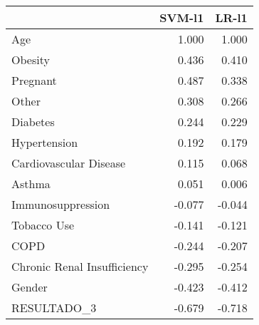 \begin{tabular}{lrr}
\toprule
{} &  SVM-l1 &  LR-l1 \\
\midrule
Age                         &   1.000 &  1.000 \\
Obesity                     &   0.436 &  0.410 \\
Pregnant                    &   0.487 &  0.338 \\
Other                       &   0.308 &  0.266 \\
Diabetes                    &   0.244 &  0.229 \\
Hypertension                &   0.192 &  0.179 \\
Cardiovascular Disease      &   0.115 &  0.068 \\
Asthma                      &   0.051 &  0.006 \\
Immunosuppression           &  -0.077 & -0.044 \\
Tobacco Use                 &  -0.141 & -0.121 \\
COPD                        &  -0.244 & -0.207 \\
Chronic Renal Insufficiency &  -0.295 & -0.254 \\
Gender                      &  -0.423 & -0.412 \\
RESULTADO\_3                 &  -0.679 & -0.718 \\
\bottomrule
\end{tabular}
